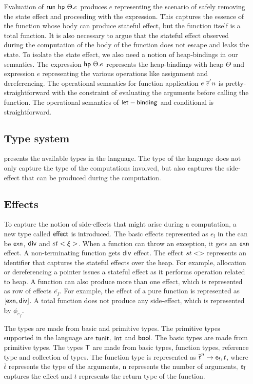 Evaluation of ${\mathsf{run}}\ {{\mathsf{hp}}\ {\Theta}.{e}}$ produces $e$ representing the scenario of safely removing the state effect and proceeding with the expression. This captures the essence of the function whose body can produce stateful effect, but the function itself is a total function. It is also necessary to argue that the stateful effect observed during the computation of the body of the function does not escape and leaks the state. To isolate the state effect, we also need a notion of heap-bindings in our semantics. The expression ${\mathsf{hp}}\ {\Theta}.{e}$ represents the heap-bindings with heap $\Theta$ and expression $e$ representing the various operations like assignment and dereferencing.
The operational semantics for function application $e \ \overline{e}^{'} n$ is pretty-straightforward with the constraint of evaluating the arguments before calling the function. The operational semantics of ${\mathsf{let-binding}}$ and conditional is straightforward.



\subsection{Type system}

 presents the available types in the language. The type of the language does not only capture the type of the computations involved, but also captures the side-effect that can be produced during the computation.
\subsection{Effects}
To capture the notion of side-effects that might arise during a computation, a new type called ${\mathsf{effect}}$ is introduced. The basic effects represented as $e_l$ in the  can be ${\mathsf{exn}}$, ${\mathsf{div}}$ and $st<\xi>$. When a function can throw an exception, it gets an ${\mathsf{exn}}$ effect. A non-terminating function gets ${\mathsf{div}}$ effect. The effect $\hid$ represents an identifier that captures the stateful effects over the heap. For example, allocation or dereferencing a pointer issues a stateful effect as it performs operation related to heap.
A function can also produce more than one effect, which is represented as row of effects $\overline{e_f}$. For example, the effect of a pure function is represented as $[{\mathsf{exn}}, {\mathsf{div}}]$. A total function does not produce any side-effect, which is represented by $\phi_{e_f}$. 

The types are made from basic and primitive types. The primitive types supported in the language are ${\mathsf{tunit}}$, ${\mathsf{int}}$ and ${\mathsf{bool}}$. The basic types are made from primitive types. The types ${\mathsf{T}}$ are made from basic types, function types, reference type and collection of types. The function type is represented as $\overline{t}^n \rightarrow {\ensuremath{\mathsf{e_f}}}, t$, where $\overline{t}$ represents the type of the arguments, n represents the number of arguments, ${{\mathsf{e_f}}}$ captures the effect and $t$ represents the return type of the function.

